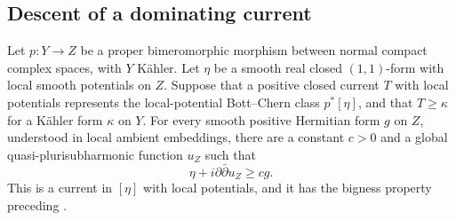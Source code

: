 

\subsection{Descent of a dominating current}

\begin{lemma}
\label{lem:dominating-current-descent}
Let \(p:Y\to Z\) be a proper bimeromorphic morphism between normal
compact complex spaces, with \(Y\) K\"ahler.  Let \(\eta\) be a smooth
real closed \((1,1)\)-form with local smooth potentials on \(Z\).
Suppose that a positive closed current \(T\) with local potentials
represents the local-potential Bott--Chern class \(p^*[\eta]\), and that
\(T\geq\kappa\) for a K\"ahler form \(\kappa\) on \(Y\).  For every
smooth positive Hermitian form \(g\) on \(Z\), understood in local
ambient embeddings, there are a constant \(c>0\) and a global
quasi-plurisubharmonic function \(u_Z\) such that
\begin{equation}\label{eq:dominating-current-descent}
 \eta+i\partial\bar\partial u_Z\geq c g.
\end{equation}
This is a current in \([\eta]\) with local potentials, and it has the
bigness property preceding \cite[Theorem~2.29]{DasHaconPaun2024}.
\end{lemma}
